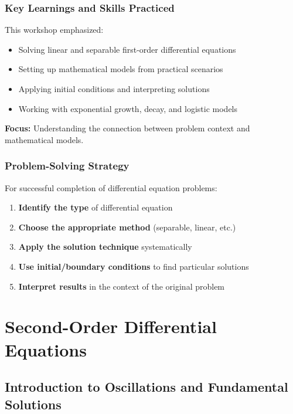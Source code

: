 \documentclass[12pt, letterpaper]{book}
\theoremstyle{problemstyle}
\theoremstyle{solutionstyle}
\begin{document}
\section{Key Learnings and Skills Practiced}
This workshop emphasized:
\begin{itemize}
    \item Solving linear and separable first-order differential equations
    \item Setting up mathematical models from practical scenarios
    \item Applying initial conditions and interpreting solutions
    \item Working with exponential growth, decay, and logistic models
\end{itemize}

\textbf{Focus:} Understanding the connection between problem context and mathematical models.

\section{Problem-Solving Strategy}
For successful completion of differential equation problems:
\begin{enumerate}
    \item \textbf{Identify the type} of differential equation
    \item \textbf{Choose the appropriate method} (separable, linear, etc.)
    \item \textbf{Apply the solution technique} systematically
    \item \textbf{Use initial/boundary conditions} to find particular solutions
    \item \textbf{Interpret results} in the context of the original problem
\end{enumerate}

\part{Second-Order Differential Equations}
\label{part:second_order_de}

\chapter{Introduction to Oscillations and Fundamental Solutions}
\label{chap:session_5}
\end{document}

